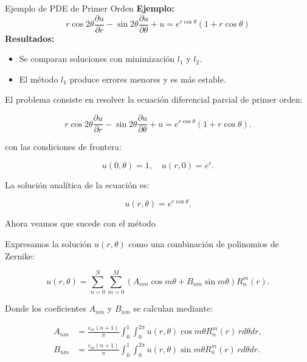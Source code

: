\documentclass{beamer}
\begin{document}
\begin{frame}{Ejemplo de PDE de Primer Orden}
    \textbf{Ejemplo:}
    \[
    r \cos 2\theta \frac{\partial u}{\partial r} - \sin 2\theta \frac{\partial u}{\partial \theta} + u = e^{r\cos\theta}(1 + r\cos\theta)
    \]
    \textbf{Resultados:}
    \begin{itemize}
        \item Se comparan soluciones con minimización \( l_1 \) y \( l_2 \).
        \item El método \( l_1 \) produce errores menores y es más estable.
    \end{itemize}
\end{frame}

\begin{frame}
  El problema consiste en resolver la ecuación diferencial parcial de primer orden:

\begin{equation}
    r \cos 2\theta \frac{\partial u}{\partial r} - \sin 2\theta \frac{\partial u}{\partial \theta} + u = e^{r\cos\theta}(1 + r\cos\theta).
    \label{eq:edp}
\end{equation}

con las condiciones de frontera:

\begin{equation}
    u(0, \theta) = 1, \quad u(r, 0) = e^r.
\end{equation}  
\end{frame}

\begin{frame}
  La solución analítica de la ecuación es:

\begin{equation}
    u(r, \theta) = e^{r\cos\theta}.
\end{equation}

Ahora veamos que sucede con el método
\end{frame}

\begin{frame}
  Expresamos la solución \( u(r, \theta) \) como una combinación de polinomios de Zernike:

\begin{equation}
    u(r, \theta) = \sum_{n=0}^{N} \sum_{m=0}^{M} (A_{nm} \cos m\theta + B_{nm} \sin m\theta) R_n^m(r).
\end{equation}

Donde los coeficientes \( A_{nm} \) y \( B_{nm} \) se calculan mediante:

\begin{align}
    A_{nm} &= \frac{\epsilon_m (n+1)}{\pi} \int_0^1 \int_0^{2\pi} u(r, \theta) \cos m\theta R_n^m(r) \, rd\theta dr, \\
    B_{nm} &= \frac{\epsilon_m (n+1)}{\pi} \int_0^1 \int_0^{2\pi} u(r, \theta) \sin m\theta R_n^m(r) \, rd\theta dr.
\end{align}  
\end{frame}
\end{document}
